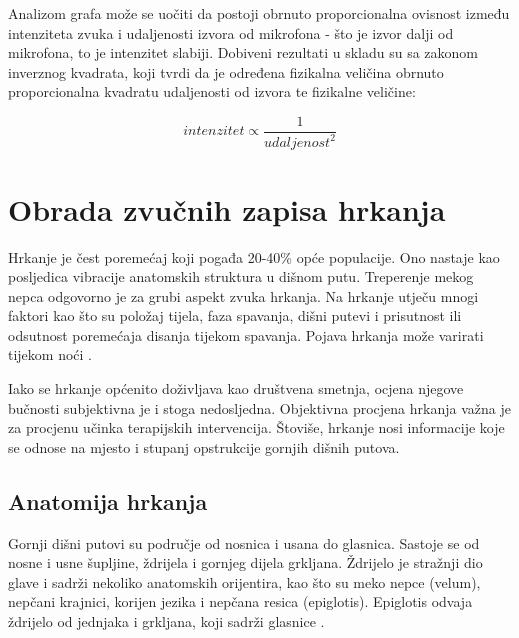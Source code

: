 Analizom grafa može se uočiti da postoji obrnuto proporcionalna ovisnost između intenziteta zvuka i udaljenosti izvora od mikrofona - što je izvor dalji od mikrofona, to je intenzitet slabiji. Dobiveni rezultati u skladu su sa zakonom inverznog kvadrata, koji tvrdi da je određena fizikalna veličina obrnuto proporcionalna kvadratu udaljenosti od izvora te fizikalne veličine: 

\begin{equation}
	intenzitet \propto \dfrac{1}{{udaljenost}^2}
\end{equation}



\section{Obrada zvučnih zapisa hrkanja}

Hrkanje je čest poremećaj koji pogađa 20-40\% opće populacije. Ono nastaje kao posljedica vibracije anatomskih struktura u dišnom putu. Treperenje mekog nepca odgovorno je za grubi aspekt zvuka hrkanja. Na hrkanje utječu mnogi faktori kao što su položaj tijela, faza spavanja, dišni putevi i prisutnost ili odsutnost poremećaja disanja tijekom spavanja. Pojava hrkanja može varirati tijekom noći \cite{pevernagie}. 

Iako se hrkanje općenito doživljava kao društvena smetnja, ocjena njegove bučnosti subjektivna je i stoga nedosljedna. Objektivna procjena hrkanja važna je za procjenu učinka terapijskih intervencija. Štoviše, hrkanje nosi informacije koje se odnose na mjesto i stupanj opstrukcije gornjih dišnih putova.

\subsection{Anatomija hrkanja}
Gornji dišni putovi su područje od nosnica i usana do glasnica. Sastoje se od nosne i usne šupljine, ždrijela i gornjeg dijela grkljana. Ždrijelo je stražnji dio glave i sadrži nekoliko anatomskih orijentira, kao što su meko nepce (velum), nepčani krajnici, korijen jezika i nepčana resica (epiglotis). Epiglotis odvaja ždrijelo od jednjaka i grkljana, koji sadrži glasnice \cite{snoringml}.

